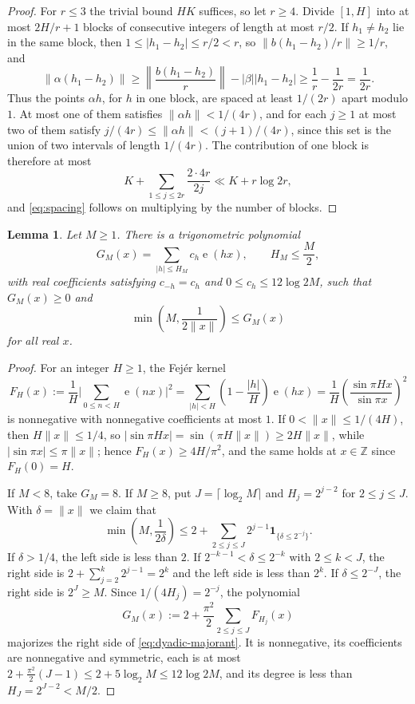 \documentclass[11pt]{amsart}
\numberwithin{equation}{section}
\numberwithin{figure}{section}
\newtheorem{lemma}{Lemma}[section]
\theoremstyle{definition}
\newcommand{\Z}{\mathbb{Z}}
\newcommand{\e}{\operatorname{e}}
\begin{document}
\begin{proof}
For $r\le3$ the trivial bound $HK$ suffices, so let $r\ge4$.  Divide
$[1,H]$ into at most $2H/r+1$ blocks of consecutive integers of length at
most $r/2$.  If $h_1\ne h_2$ lie in the same block, then
$1\le|h_1-h_2|\le r/2<r$, so $\|b(h_1-h_2)/r\|\ge1/r$, and
\[
  \|\alpha(h_1-h_2)\|\ge\left\|\frac{b(h_1-h_2)}r\right\|-|\beta||h_1-h_2|
  \ge\frac1r-\frac1{2r}=\frac1{2r}.
\]
Thus the points $\alpha h$, for $h$ in one block, are spaced at least
$1/(2r)$ apart modulo $1$.  At most one of them satisfies
$\|\alpha h\|<1/(4r)$, and for each $j\ge1$ at most two of them satisfy
$j/(4r)\le\|\alpha h\|<(j+1)/(4r)$, since this set is the union of two
intervals of length $1/(4r)$.  The contribution of one block is therefore
at most
\[
  K+\sum_{1\le j\le2r}\frac{2\cdot4r}{2j}\ll K+r\log 2r,
\]
and \eqref{eq:spacing} follows on multiplying by the number of blocks.
\end{proof}

\begin{lemma}\label{lem:majorant}
Let $M\ge1$.  There is a trigonometric polynomial
\begin{equation}\label{eq:G-def}
  G_M(x)=\sum_{|h|\le H_M}c_h\e(hx),
  \qquad H_M\le\frac M2,
\end{equation}
with real coefficients satisfying $c_{-h}=c_h$ and
$0\le c_h\le12\log 2M$, such that $G_M(x)\ge0$ and
\begin{equation}\label{eq:G-majorizes}
  \min\left(M,\frac1{2\|x\|}\right)\le G_M(x)
\end{equation}
for all real $x$.
\end{lemma}

\begin{proof}
For an integer $H\ge1$, the Fej\'er kernel
\[
  F_H(x):=\frac1H\bigg|\sum_{0\le n<H}\e(nx)\bigg|^2
  =\sum_{|h|<H}\left(1-\frac{|h|}H\right)\e(hx)
  =\frac1H\left(\frac{\sin\pi Hx}{\sin\pi x}\right)^2
\]
is nonnegative with nonnegative coefficients at most $1$.  If
$0<\|x\|\le1/(4H)$, then $H\|x\|\le1/4$, so
$|\sin\pi Hx|=\sin(\pi H\|x\|)\ge2H\|x\|$, while $|\sin\pi x|\le\pi\|x\|$;
hence $F_H(x)\ge4H/\pi^2$, and the same holds at $x\in\Z$ since
$F_H(0)=H$.

If $M<8$, take $G_M=8$.  If $M\ge8$, put $J=\lceil\log_2M\rceil$ and
$H_j=2^{j-2}$ for $2\le j\le J$.  With $\delta=\|x\|$ we claim that
\begin{equation}\label{eq:dyadic-majorant}
  \min\left(M,\frac1{2\delta}\right)
  \le2+\sum_{2\le j\le J}2^{j-1}\mathbf1_{\{\delta\le2^{-j}\}}.
\end{equation}
If $\delta>1/4$, the left side is less than $2$.  If
$2^{-k-1}<\delta\le2^{-k}$ with $2\le k<J$, the right side is
$2+\sum_{j=2}^k2^{j-1}=2^k$ and the left side is less than $2^k$.  If
$\delta\le2^{-J}$, the right side is $2^J\ge M$.  Since
$1/(4H_j)=2^{-j}$, the polynomial
\[
  G_M(x):=2+\frac{\pi^2}2\sum_{2\le j\le J}F_{H_j}(x)
\]
majorizes the right side of \eqref{eq:dyadic-majorant}.  It is
nonnegative, its coefficients are nonnegative and symmetric, each is at most
$2+\frac{\pi^2}2(J-1)\le2+5\log_2M\le12\log2M$, and its degree is less
than $H_J=2^{J-2}<M/2$.
\end{proof}
\end{document}
